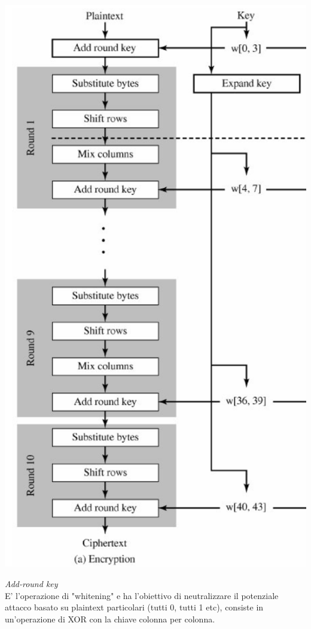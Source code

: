 \documentclass[11pt, oneside]{article}   	%
\begin{document}
\begin{center}
\includegraphics[scale= 0.4]{AES}
\end{center}
\emph{Add-round key}\\
E' l'operazione di "whitening" e ha l'obiettivo di neutralizzare il potenziale attacco basato su plaintext particolari (tutti 0, tutti 1 etc), consiste in un'operazione di XOR con la chiave colonna per colonna.\\\\
\end{document}
